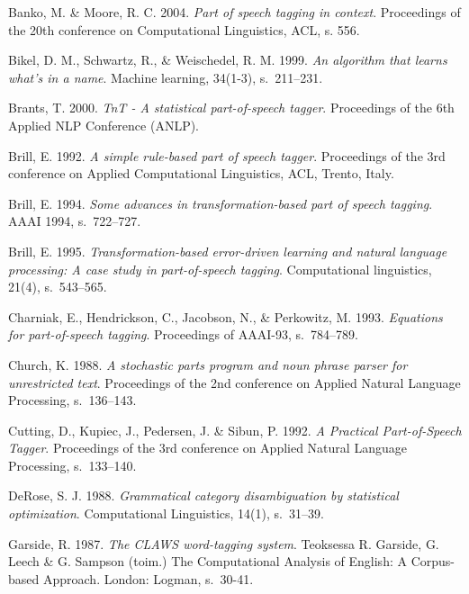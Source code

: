 \documentclass[utf8,bachelor,manualbib]{gradu3}
\begin{document}
\begin{thebibliography}{}

Banko, M. \& Moore, R. C. 2004. \textit{Part of speech tagging in context}. Proceedings of the 20th conference on Computational Linguistics, ACL, s. 556.

Bikel, D. M., Schwartz, R., \& Weischedel, R. M. 1999. \textit{An algorithm that learns what's in a name}. Machine learning, 34(1-3), s.~211--231.

Brants, T. 2000. \textit{TnT - A statistical part-of-speech tagger}. Proceedings of the 6th Applied NLP Conference (ANLP).

Brill, E. 1992. \textit{A simple rule-based part of speech tagger}. Proceedings of the 3rd conference on Applied Computational Linguistics, ACL, Trento, Italy.

Brill, E. 1994. \textit{Some advances in transformation-based part of speech tagging}. AAAI 1994, s.~722--727.

Brill, E. 1995. \textit{Transformation-based error-driven learning and natural language processing: A case study in part-of-speech tagging}. Computational linguistics, 21(4), s.~543--565.

Charniak, E., Hendrickson, C., Jacobson, N., \& Perkowitz, M. 1993. \textit{Equations for part-of-speech tagging}. Proceedings of AAAI-93, s.~784--789.

Church, K. 1988. \textit{A stochastic parts program and noun phrase parser for unrestricted text}. Proceedings of the 2nd conference on Applied Natural Language Processing, s.~136--143.

Cutting, D., Kupiec, J., Pedersen, J. \& Sibun, P. 1992. \textit{A Practical Part-of-Speech Tagger}. Proceedings of the 3rd conference on Applied Natural Language Processing, s.~133--140.

DeRose, S. J. 1988. \textit{Grammatical category disambiguation by statistical optimization}. Computational Linguistics, 14(1), s.~31--39.

Garside, R. 1987. \textit{The CLAWS word-tagging system}. Teoksessa R. Garside, G. Leech \& G. Sampson (toim.) The Computational Analysis of English: A Corpus-based Approach. London: Logman, s.~30-41.


\end{thebibliography}
\end{document}
